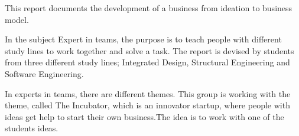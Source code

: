 This report documents the development of a business from ideation to business model.

In the subject Expert in teams, the purpose is to teach people with different study lines to work together and solve a task. The report is devised by students from three different study lines; Integrated Design, Structural Engineering and Software Engineering.

In experts in teams, there are different themes.
This group is working with the theme, called The Incubator, which is an innovator startup, where people with ideas get help to start their own business.The idea is to work with one of the students ideas.